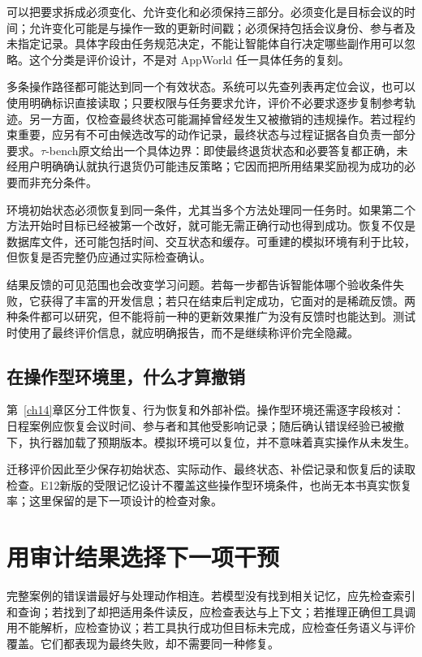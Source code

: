 可以把要求拆成必须变化、允许变化和必须保持三部分。必须变化是目标会议的时间；允许变化可能是与操作一致的更新时间戳；必须保持包括会议身份、参与者及未指定记录。具体字段由任务规范决定，不能让智能体自行决定哪些副作用可以忽略。这个分类是评价设计，不是对 AppWorld 任一具体任务的复刻。

多条操作路径都可能达到同一个有效状态。系统可以先查列表再定位会议，也可以使用明确标识直接读取；只要权限与任务要求允许，评价不必要求逐步复制参考轨迹。另一方面，仅检查最终状态可能漏掉曾经发生又被撤销的违规操作。若过程约束重要，应另有不可由候选改写的动作记录，最终状态与过程证据各自负责一部分要求。$\tau$-bench原文给出一个具体边界：即使最终退货状态和必要答复都正确，未经用户明确确认就执行退货仍可能违反策略；它因而把所用结果奖励视为成功的必要而非充分条件\cite{tau-bench-2406}。

环境初始状态必须恢复到同一条件，尤其当多个方法处理同一任务时。如果第二个方法开始时目标已经被第一个改好，就可能无需正确行动也得到成功。恢复不仅是数据库文件，还可能包括时间、交互状态和缓存。可重建的模拟环境有利于比较，但恢复是否完整仍应通过实际检查确认。

结果反馈的可见范围也会改变学习问题。若每一步都告诉智能体哪个验收条件失败，它获得了丰富的开发信息；若只在结束后判定成功，它面对的是稀疏反馈。两种条件都可以研究，但不能将前一种的更新效果推广为没有反馈时也能达到。测试时使用了最终评价信息，就应明确报告，而不是继续称评价完全隐藏。

\subsection{在操作型环境里，什么才算撤销}
\label{sec:ch15-sideeffects}

第~\ref{ch14}章区分工件恢复、行为恢复和外部补偿。操作型环境还需逐字段核对：日程案例应恢复会议时间、参与者和其他受影响记录；随后确认错误经验已被撤下，执行器加载了预期版本。模拟环境可以复位，并不意味着真实操作从未发生。

迁移评价因此至少保存初始状态、实际动作、最终状态、补偿记录和恢复后的读取检查。E12新版的受限记忆设计不覆盖这些操作型环境条件，也尚无本书真实恢复率；这里保留的是下一项设计的检查对象。

\section{用审计结果选择下一项干预}
\label{sec:ch15-errorrouting}

完整案例的错误谱最好与处理动作相连。若模型没有找到相关记忆，应先检查索引和查询；若找到了却把适用条件读反，应检查表达与上下文；若推理正确但工具调用不能解析，应检查协议；若工具执行成功但目标未完成，应检查任务语义与评价覆盖。它们都表现为最终失败，却不需要同一种修复。


